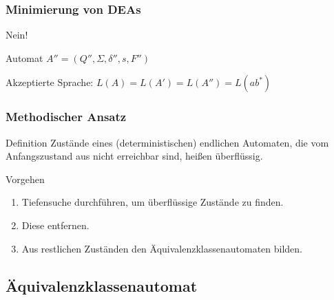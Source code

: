 \begin{frame}
 \frametitle{Minimierung von DEAs}
Nein!
\begin{block}{Automat \(A'' = (Q'', \Sigma, \delta'', s, F'')\)}
 \begin{figure}[H]
\begin{center}
\end{center}
\end{figure}
\end{block}
\begin{block}{}
 Akzeptierte Sprache: \(L(A) = L(A') = L(A'') = L(ab^*) \)
\end{block}
\end{frame}
\begin{frame}
 \frametitle{Methodischer Ansatz}
 \begin{block}{Definition}
  Zustände eines (deterministischen) endlichen Automaten, die vom Anfangszustand aus nicht erreichbar sind, heißen überflüssig.
 \end{block}
\begin{block}{Vorgehen}
 \begin{enumerate}
  \item Tiefensuche durchführen, um überflüssige Zustände zu finden.
  \item Diese entfernen.
  \item Aus restlichen Zuständen den Äquivalenzklassenautomaten bilden.
 \end{enumerate}
\end{block}
\end{frame}

\subsection{Äquivalenzklassenautomat}

